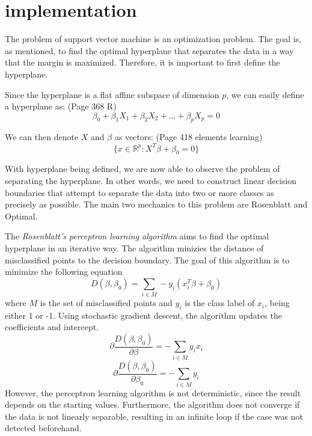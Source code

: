 \section{implementation}
The problem of support vector machine is an optimization problem. The goal is, as mentioned, 
to find the optimal hyperplane that separates the data in a way that the margin is maximized.
Therefore, it is important to first define the hyperplane.

Since the hyperplane is a flat affine subspace of dimension $p$, we can easily define a hyperplane as: (Page 368 R)
\begin{equation}
    \beta_0 + \beta_1X_1 + \beta_2X_2 + ... + \beta_pX_p = 0
\end{equation}

We can then denote $X$ and $\beta$ as vectors: (Page 418 elements learning)
\begin{equation}
    \{x \in \mathbb{R}^p: X^T \beta + \beta_0 = 0\}
\end{equation}

With hyperplane being defined, we are now able to observe the problem of separating the hyperplane. 
In other words, we need to construct linear decision
boundaries that attempt to separate the data into two or more classes as precisely as possible. 
The main two mechanics to this problem are Rosenblatt and Optimal.

The \emph{Rosenblatt's perceptron learning algorithm} aims to find the optimal hyperplane in an iterative way. The algorithm minizies
the distance of misclassified points to the decision boundary. The goal of this algorithm is to minimize the following equation
\begin{equation}
    D(\beta, \beta_0) = \sum_{i\in M} -y_i(x_i^T \beta + \beta_0)
\end{equation}
where $M$ is the set of misclassified points and $y_i$ is the class label of $x_i$, being either 1 or -1. Using stochastic gradient
descent, the algorithm updates the coefficients and intercept. 
\begin{equation}
    \partial\frac{D(\beta, \beta_0)}{\partial\beta} = -\sum_{i\in M} y_ix_i
\end{equation}
\begin{equation}
    \partial\frac{D(\beta, \beta_0)}{\partial\beta_0} = -\sum_{i\in M} y_i
\end{equation}
However, the perceptron learning algorithm is not deterministic, since
the result depends on the starting values. Furthermore, the algorithm does not converge if the data is not linearly separable, resulting
in an infinite loop if the case was not detected beforehand.

